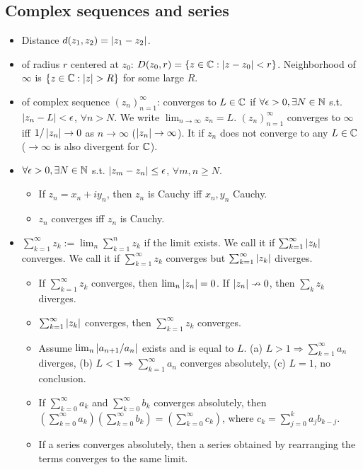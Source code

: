 \documentclass[10pt,a4paper]{book}
\begin{document}
\subsection{Complex sequences and series}\label{sec:complex-seq}
\begin{itemize}
	\item Distance $d(z_1,z_2)=\left\lvert z_1-z_2\right\rvert$.
	\item {} of radius $r$ centered at $z_0$: $D(z_0,r)=\{z\in\mathbb C : \left\lvert z-z_0\right\rvert<r\}$. Neighborhood of $\infty $ is $\{z\in\mathbb C:\left\lvert z\right\rvert>R\}$ for some large $R$.   
	\item {} of complex sequence $(z_n)_{n=1}^\infty $: converges to $L\in\mathbb C$ if $\forall \epsilon>0, \exists N\in\mathbb N $ s.t. $\left\lvert z_n-L\right\rvert<\epsilon$, $\forall n>N$. We write $\lim_{n\to \infty }z_n=L$. $(z_n)_{n=1}^\infty$ converges to $\infty $ iff $1/\left\lvert z_n\right\rvert\to 0$ as $n\to \infty $ ($\left\lvert z_n\right\rvert\to \infty $). It  if $z_n$ does not converge to any $L\in\mathbb C$ ($\to \infty $ is also divergent for $\mathbb C$).
	\item {} $\forall \epsilon>0,\exists N\in\mathbb N$ s.t. $\left\lvert z_m-z_n\right\rvert\leq \epsilon$, $\forall m,n\geq N$.
	\begin{itemize}
		\item If $z_n=x_n+i y_n$, then $z_n$ is Cauchy iff $x_n,y_n$ Cauchy.
		\item $z_n$ converges iff $z_n$ is Cauchy.     
	\end{itemize}                
	\item {} $\sum_{k=1}^{\infty }z_k :=\lim_{n} \sum_{k=1}^{n}z_k$ if the limit exists. We call it  if $\sum_{k=1}^{\infty }\left\lvert z_k\right\rvert$ converges. We call it  if $\sum_{k=1}^{\infty }z_k$ converges but $\sum_{k=1}^{\infty }\left\lvert z_k\right\rvert$ diverges.  
	\begin{itemize}
		\item {} If $\sum_{k=1}^{\infty }z_k$ converges, then $\lim_{n}\left\lvert z_n\right\rvert=0$. If $\left\lvert z_n\right\rvert\nrightarrow 0$, then $\sum_{k}z_k$ diverges.
		\item {} $\sum_{k=1}^{\infty }\left\lvert z_k\right\rvert$ converges, then $\sum_{k=1}^{\infty }z_k$ converges.     
		\item {} Assume $\lim_{n}\left\lvert a_{n+1}/a_n\right\rvert$ exists and is equal to $L$. (a) $L>1\Rightarrow\sum_{k=1}^{\infty }a_n $ diverges, (b)  $L<1\Rightarrow\sum_{k=1}^{\infty }a_n $ converges absolutely, (c) $L=1$, no conclusion.
		\item If $\sum_{k=0}^{\infty }a_k$ and $\sum_{k=0}^{\infty }b_k$ converges absolutely, then $(\sum_{k=0}^{\infty }a_k)(\sum_{k=0}^{\infty }b_k)=(\sum_{k=0}^{\infty }c_k)$, where $c_k=\sum_{j=0}^{k}a_j b_{k-j}$.
		\item If a series converges absolutely, then a series obtained by rearranging the terms converges to the same limit.    
	\end{itemize} 
\end{itemize}
\end{document}
